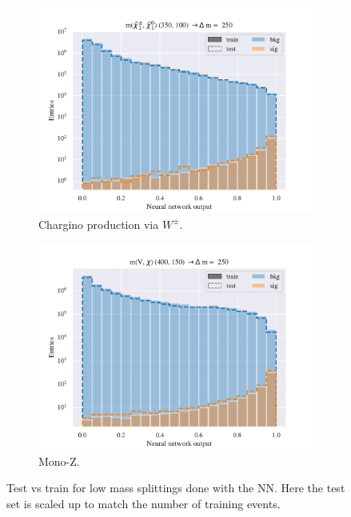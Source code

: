 \begin{figure}[H]
    \begin{subfigure}[t!]{0.49\textwidth}
        \includegraphics[width = \textwidth]{Figures/WW/NN/All_level/Inter/scaled_train_test_395320.pdf}
        \caption{Chargino production via $W^\pm$.}
        \label{fig:WWNNLow}
    \end{subfigure}
    \begin{subfigure}[t!]{0.49\textwidth}
        \includegraphics[width = \textwidth]{Figures/Mono_Z/ML/NN/All_level/Inter/scaled_train_test_310613.pdf}
        \caption{Mono-Z.}
        \label{fig:MonoZNNLow}
    \end{subfigure}
    \caption{Test vs train for low mass splittings done with the NN. Here the test set is scaled up to match the number of training events.}
    \label{fig:AllLowNN}
\end{figure}



















